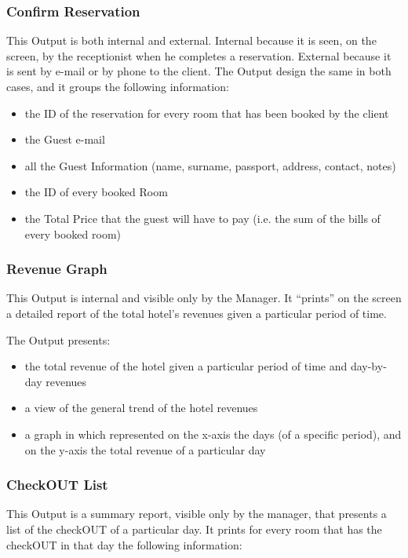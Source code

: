 \subsubsection{Confirm Reservation}

This Output is both internal and external. Internal because it is seen, on the screen, by the receptionist when he completes a reservation. External because it is sent by e-mail or by phone to the client. The Output design the same in both cases, and it groups the following information:
\begin{itemize}
  \item the ID of the reservation for every room that has been booked by the client
  \item the Guest e-mail
  \item all the Guest Information (name, surname, passport, address, contact, notes)
  \item the ID of every booked Room
  \item the Total Price that the guest will have to pay (i.e. the sum of the bills of every booked room)
\end{itemize}

\subsubsection{Revenue Graph}

This Output is internal and visible only by the Manager. It “prints” on the screen a detailed report of the total hotel’s revenues given a particular period of time.

The Output presents:

\begin{itemize}
  \item the total revenue of the hotel given a particular period of time and day-by-day revenues
  \item a view of the general trend of the hotel revenues
  \item a graph in which represented on the x-axis the days (of a specific period), and on the y-axis the total revenue of a particular day
\end{itemize}


\subsubsection{CheckOUT List}

This Output is a summary report, visible only by the manager, that presents a list of the checkOUT of a particular day. It prints for every room that has the checkOUT in that day the following information:

